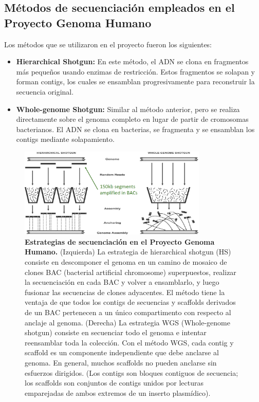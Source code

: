 \subsection{Métodos de secuenciación empleados en el Proyecto Genoma Humano}
Los métodos que se utilizaron en el proyecto fueron los siguientes:
\begin{itemize}
\item \textbf{Hierarchical Shotgun:} En este método, el ADN se clona en fragmentos más pequeños usando enzimas de restricción. Estos fragmentos se solapan y forman contigs, los cuales se ensamblan progresivamente para reconstruir la secuencia original.
\item \textbf{Whole-genome Shotgun:} Similar al método anterior, pero se realiza directamente sobre el genoma completo en lugar de partir de cromosomas bacterianos. El ADN se clona en bacterias, se fragmenta y se ensamblan los contigs mediante solapamiento.
\end{itemize}

\begin{figure}[htbp]
\centering
\includegraphics[width = 0.8\textwidth]{figs/HGP-sequencing.png}
\caption{\textbf{Estrategias de secuenciación en el Proyecto Genoma Humano.} (Izquierda) La estrategia de hierarchical shotgun (HS) consiste en descomponer el genoma en un camino de mosaico de clones BAC (bacterial artificial chromosome) superpuestos, realizar la secuenciación en cada BAC y volver a ensamblarlo, y luego fusionar las secuencias de clones adyacentes. El método tiene la ventaja de que todos los contigs de secuencias y scaffolds derivados de un BAC pertenecen a un único compartimento con respecto al anclaje al genoma. (Derecha) La estrategia WGS (Whole-genome shotgun) consiste en secuenciar todo el genoma e intentar reensamblar toda la colección. Con el método WGS, cada contig y scaffold es un componente independiente que debe anclarse al genoma. En general, muchos scaffolds no pueden anclarse sin esfuerzos dirigidos. (Los contigs son bloques contiguos de secuencia; los scaffolds son conjuntos de contigs unidos por lecturas emparejadas de ambos extremos de un inserto plasmídico).}
\end{figure}

